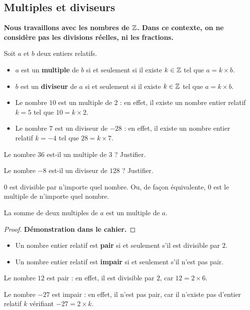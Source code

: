 \documentclass{poly}
\begin{document}
\subsection{Multiples et diviseurs}
\textbf{Nous travaillons avec les nombres de $\mathbb{Z}$. Dans ce contexte, on ne considère pas les divisions réelles, ni les fractions.}
\begin{definition}
Soit $a$ et $b$ deux entiers relatifs.
\begin{itemize}
\item $a$ est un \textbf{multiple} de $b$ si et seulement si il existe $k \in \mathbb{Z}$ tel que $a = k \times b$.
\item $b$ est un \textbf{diviseur} de $a$ si et seulement si il existe $k \in \mathbb{Z}$ tel que $a = k \times b$.
\end{itemize}
\end{definition}
\begin{example}
\hfill
\begin{itemize}
\item Le nombre $10$ est un multiple de $2$ : en effet, il existe un nombre entier relatif $k = 5$ tel que $10 = k \times 2$.
\item Le nombre $7$ est un diviseur de $-28$ : en effet, il existe un nombre entier relatif $k = -4$ tel que $28 = k \times 7$.
\end{itemize}
\end{example}
\begin{example}
\hfill

Le nombre $36$ est-il un multiple de $3$ ? Justifier. 

Le nombre $-8$ est-il un diviseur de $128$ ? Justifier. 
\end{example}

\begin{remark}
$0$ est divisible par n'importe quel nombre. Ou, de façon équivalente, $0$ est le multiple de n'importe quel nombre. 
\end{remark}

\begin{proposition}
La somme de deux multiples de $a$ est un multiple de $a$.
\end{proposition}
\begin{proof} \textbf{Démonstration dans le cahier.}

\end{proof}
\begin{definition}
\hfill
\begin{itemize}
\item Un nombre entier relatif est \textbf{pair} si et seulement s'il est divisible par $2$.
\item Un nombre entier relatif est \textbf{impair} si et seulement s'il n'est pas pair. 
\end{itemize}
\end{definition}
\begin{example}
\hfill

Le nombre $12$ est pair : en effet, il est divisible par $2$, car $12 = 2 \times 6$.

Le nombre $-27$ est impair : en effet, il n'est pas pair, car il n'existe pas d'entier relatif $k$ vérifiant $-27 = 2 \times k$.
\end{example}
\end{document}
